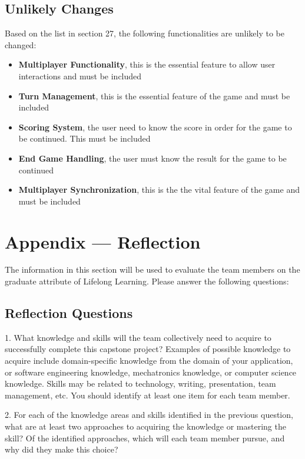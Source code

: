 \documentclass{article}
\begin{document}
\subsection{Unlikely Changes}
Based on the list in section 27, the following functionalities are unlikely to be changed:
\begin{itemize}
    \item \textbf{Multiplayer Functionality}, this is the essential feature to allow user interactions and must be included
    \item \textbf{Turn Management}, this is the essential feature of the game and must be included
    \item \textbf{Scoring System}, the user need to know the score in order for the game to be continued. This must be included
    \item \textbf{End Game Handling}, the user must know the result for the game to be continued
    \item \textbf{Multiplayer Synchronization}, this is the the vital feature of the game and must be included
\end{itemize}


\section{Appendix — Reflection}
The information in this section will be used to evaluate the team members on the graduate attribute of Lifelong Learning. Please answer the following questions:

\subsection{Reflection Questions}

1. What knowledge and skills will the team collectively need to acquire to successfully complete this capstone project? Examples of possible knowledge to acquire include domain-specific knowledge from the domain of your application, or software engineering knowledge, mechatronics knowledge, or computer science knowledge. Skills may be related to technology, writing, presentation, team management, etc. You should identify at least one item for each team member.

2. For each of the knowledge areas and skills identified in the previous question, what are at least two approaches to acquiring the knowledge or mastering the skill? Of the identified approaches, which will each team member pursue, and why did they make this choice?
\end{document}

